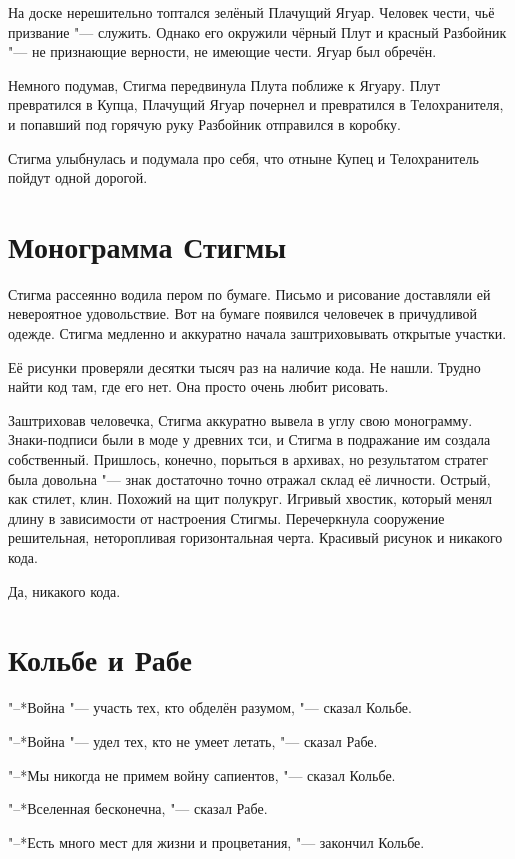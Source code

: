 \documentclass[a4paper,10pt]{book}
\begin{document}
На доске нерешительно топтался зелёный Плачущий Ягуар. Человек чести, чьё 
призвание "--- служить. Однако его окружили чёрный Плут и красный Разбойник 
"--- не признающие верности, не имеющие чести. Ягуар был обречён.

Немного подумав, Стигма передвинула Плута поближе к Ягуару. Плут превратился в 
Купца, Плачущий Ягуар почернел и превратился в Телохранителя, и попавший под 
горячую руку Разбойник отправился в коробку.

Стигма улыбнулась и подумала про себя, что отныне Купец и Телохранитель пойдут 
одной дорогой.

\section{Монограмма Стигмы}

Стигма рассеянно водила пером по бумаге. Письмо и рисование доставляли ей 
невероятное удовольствие. Вот на бумаге появился человечек в причудливой 
одежде. Стигма медленно и аккуратно начала заштриховывать открытые участки.

Её рисунки проверяли десятки тысяч раз на наличие кода. Не нашли. Трудно найти 
код там, где его нет. Она просто очень любит рисовать.

Заштриховав человечка, Стигма аккуратно вывела в углу свою монограмму. 
Знаки-подписи
были в моде у древних тси, и Стигма в подражание им создала собственный.
Пришлось, конечно, порыться в архивах, но результатом стратег была довольна "---
знак достаточно точно отражал склад её личности. Острый, 
как стилет, клин. Похожий на щит полукруг. Игривый хвостик, который менял длину 
в зависимости от настроения Стигмы. Перечеркнула сооружение решительная, 
неторопливая горизонтальная черта. Красивый рисунок и никакого кода.

Да, никакого кода.

\section{Кольбе и Рабе}

"--*Война "--- участь тех, кто обделён разумом, "--- сказал Кольбе.

"--*Война "--- удел тех, кто не умеет летать, "--- сказал Рабе.

"--*Мы никогда не примем войну сапиентов, "--- сказал Кольбе.

"--*Вселенная бесконечна, "--- сказал Рабе.

"--*Есть много мест для жизни и процветания, "--- закончил Кольбе.
\end{document}
